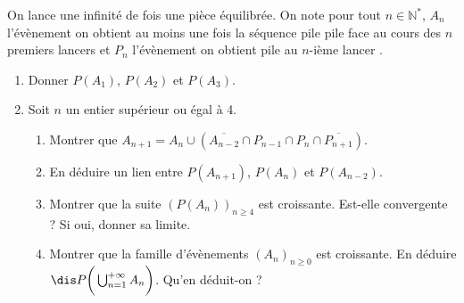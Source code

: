 \documentclass[a4paper,10pt]{report}
\begin{document}
\begin{Exa} On lance une infinité de fois une pièce équilibrée. On note pour tout $n \in \mathbb{N}^*$, $A_n$ l'évènement \og on obtient au moins une fois la séquence pile pile face au cours des $n$ premiers lancers \fg et $P_n$  l'évènement \og on obtient pile au $n$-ième lancer \fg .

\begin{enumerate}
\item Donner $P(A_1)$, $P(A_2)$ et $P(A_3)$.
\item Soit $n$ un entier supérieur ou égal à 4.
\begin{enumerate}
\item Montrer que $A_{n+1} = A_n  \cup (\overline{A_{n-2}} \cap P_{n-1} \cap P_n \cap \overline{P_{n+1}})$.
\item En déduire un lien entre $P(A_{n+1})$, $P(A_n)$ et $P(A_{n-2})$. 
\item Montrer que la suite $(P(A_n))_{n \geq 4}$ est croissante. Est-elle convergente ? Si oui, donner sa limite.
\item Montrer que la famille d'évènements $(A_n)_{n \geq 0}$ est croissante. En déduire $\dis P \bigg{(} \bigcup_{n=1}^{+  \infty} A_n \bigg{)}$. Qu'en déduit-on ?
\end{enumerate}
\end{enumerate}
\end{Exa}

\corr 
\end{document}
